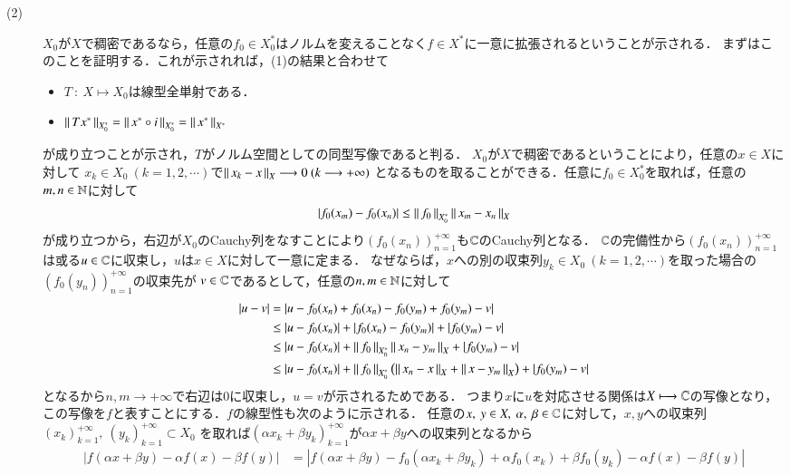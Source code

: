 \begin{prf}
\begin{description}
	\item[(2)] $X_0$が$X$で稠密であるなら，任意の$f_0 \in X_0^*$はノルムを変えることなく$f \in X^*$に一意に拡張されるということが示される．
		まずはこのことを証明する．これが示されれば，(1)の結果と合わせて
		\begin{itemize}
			\item $T\ :\ X \longmapsto X_0$は線型全単射である．
			\item $\left\|\, T x^*\, \right\|_{X_0^*} = \left\|\, x^* \circ i\, \right\|_{X_0^*} = \left\|\, x^*\, \right\|_{X^*}$
		\end{itemize}
		が成り立つことが示され，$T$がノルム空間としての同型写像であると判る．
		$X_0$が$X$で稠密であるということにより，任意の$x \in X$に対して
		$x_k \in X_0 \ (k=1,2,\cdots)$で$\left\|\, x_k - x\, \right\|_{X} \longrightarrow 0\ (k \longrightarrow +\infty)$
		となるものを取ることができる．任意に$f_0 \in X_0^*$を取れば，任意の$m,n \in \mathbb{N}$に対して
		\begin{align}
			|f_0(x_m) - f_0(x_n)| \leq \left\|\, f_0\, \right\|_{X_0^*} \left\|\, x_m - x_n\, \right\|_{X}
		\end{align}
		が成り立つから，右辺が$X_0$のCauchy列をなすことにより$(f_0(x_n))_{n=1}^{+\infty}$も$\mathbb{C}$のCauchy列となる．
		$\mathbb{C}$の完備性から$(f_0(x_n))_{n=1}^{+\infty}$は或る$u \in \mathbb{C}$に収束し，$u$は$x \in X$に対して一意に定まる．
		なぜならば，$x$への別の収束列$y_k \in X_0 \ (k=1,2,\cdots)$を取った場合の$(f_0(y_n))_{n=1}^{+\infty}$の収束先が
		$v \in \mathbb{C}$であるとして，任意の$n,m \in \mathbb{N}$に対して
		\begin{align}
			|u - v| &= |u - f_0(x_n) + f_0(x_n) - f_0(y_m) + f_0(y_m) - v| \\
			&\leq |u - f_0(x_n)| + |f_0(x_n) - f_0(y_m)| + |f_0(y_m) - v| \\
			&\leq |u - f_0(x_n)| + \left\|\, f_0\, \right\|_{X_0^*}\left\|\, x_n - y_m\, \right\|_{X} + |f_0(y_m) - v| \\
			&\leq |u - f_0(x_n)| + \left\|\, f_0\, \right\|_{X_0^*}\left(\left\|\, x_n - x\, \right\|_{X} + \left\|\, x - y_m\, \right\|_{X}\right)+ |f_0(y_m) - v|
		\end{align}
		となるから$n,m \longrightarrow +\infty$で右辺は0に収束し，$u = v$が示されるためである．
		つまり$x$に$u$を対応させる関係は$X \longmapsto \mathbb{C}$の写像となり，この写像を$f$と表すことにする．$f$の線型性も次のように示される．
		任意の$x,\ y \in X,\ \alpha,\ \beta \in \mathbb{C}$に対して，$x,y$への収束列$(x_k)_{k=1}^{+\infty},\ (y_k)_{k=1}^{+\infty} \subset X_0$
		を取れば$(\alpha x_k + \beta y_k)_{k=1}^{+\infty}$が$\alpha x+ \beta y$への収束列となるから
		\begin{align}
			|f(\alpha x + \beta y) - \alpha f(x) - \beta f(y)| 
			&= |f(\alpha x + \beta y) - f_0(\alpha x_k + \beta y_k) + \alpha f_0(x_k) + \beta f_0(y_k) - \alpha f(x) - \beta f(y)| \\

\end{align}
\end{description}
\end{prf}
